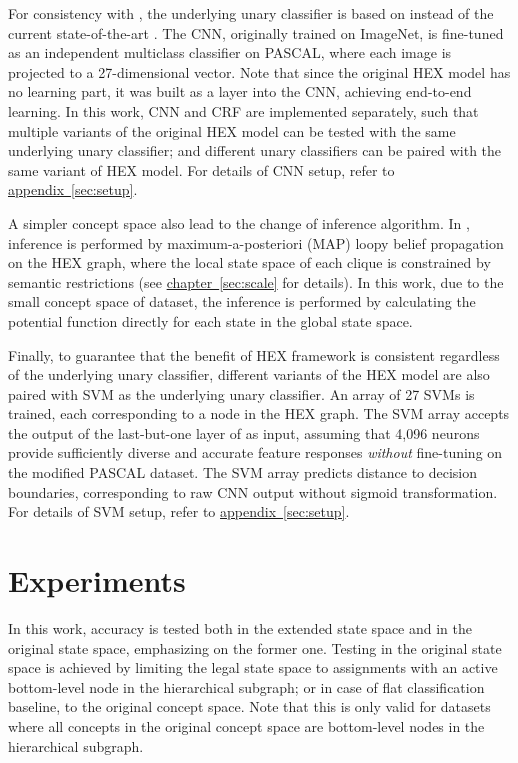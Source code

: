 \documentclass[11pt,a4paper]{book}
\begin{document}
For consistency with \cite{deng2014large}, the underlying unary classifier is based on \cite{krizhevsky2012imagenet} instead of the current state-of-the-art \cite{simonyan2014very, szegedy2014going}. The CNN, originally trained on ImageNet, is fine-tuned as an independent multiclass classifier on PASCAL, where each image is projected to a 27-dimensional vector. Note that since the original HEX model has no learning part, it was built as a layer into the CNN, achieving end-to-end learning. In this work, CNN and CRF are implemented separately, such that multiple variants of the original HEX model can be tested with the same underlying unary classifier; and different unary classifiers can be paired with the same variant of HEX model. For details of CNN setup, refer to \hyperref[sec:setup]{appendix~\ref{sec:setup}}.

A simpler concept space also lead to the change of inference algorithm. In \cite{deng2014large}, inference is performed by maximum-a-posteriori (MAP) loopy belief propagation on the HEX graph, where the local state space of each clique is constrained by semantic restrictions (see \hyperref[sec:scale]{chapter~\ref{sec:scale}} for details). In this work, due to the small concept space of dataset, the inference is performed by calculating the potential function directly for each state in the global state space.

Finally, to guarantee that the benefit of HEX framework is consistent regardless of the underlying unary classifier, different variants of the HEX model are also paired with SVM as the underlying unary classifier. An array of 27 SVMs is trained, each corresponding to a node in the HEX graph. The SVM array accepts the output of the last-but-one layer of \cite{krizhevsky2012imagenet} as input, assuming that 4,096 neurons provide sufficiently diverse and accurate feature responses \emph{without} fine-tuning on the modified PASCAL dataset. The SVM array predicts distance to decision boundaries, corresponding to raw CNN output without sigmoid transformation. For details of SVM setup, refer to \hyperref[sec:setup]{appendix~\ref{sec:setup}}.

\section{Experiments}
\label{sec:exp1}

In this work, accuracy is tested both in the extended state space and in the original state space, emphasizing on the former one. Testing in the original state space is achieved by limiting the legal state space to assignments with an active bottom-level node in the hierarchical subgraph; or in case of flat classification baseline, to the original concept space. Note that this is only valid for datasets where all concepts in the original concept space are bottom-level nodes in the hierarchical subgraph.
\end{document}
